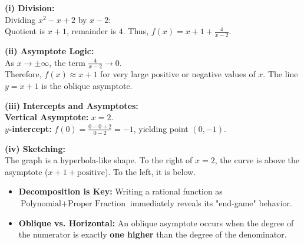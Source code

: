 \begin{solution}
\textbf{(i) Division:} \\
Dividing $x^2 - x + 2$ by $x - 2$: \\
Quotient is $x+1$, remainder is $4$. Thus, $f(x) = x + 1 + \frac{4}{x-2}$.

\textbf{(ii) Asymptote Logic:} \\
As $x \to \pm\infty$, the term $\frac{4}{x-2} \to 0$. \\
Therefore, $f(x) \approx x + 1$ for very large positive or negative values of $x$. The line $y = x + 1$ is the oblique asymptote.

\textbf{(iii) Intercepts and Asymptotes:} \\
\textbf{Vertical Asymptote:} $x = 2$. \\
\textbf{$y$-intercept:} $f(0) = \frac{0-0+2}{0-2} = -1$, yielding point $(0, -1)$.

\textbf{(iv) Sketching:} \\
The graph is a hyperbola-like shape. To the right of $x=2$, the curve is above the asymptote ($x+1 + \text{positive}$). To the left, it is below.

\begin{center}
\end{center}
\end{solution}

\begin{takeaways}
\begin{itemize}[leftmargin=*]
\item \textbf{Decomposition is Key:} Writing a rational function as $\text{Polynomial} + \text{Proper Fraction}$ immediately reveals its "end-game" behavior.
\item \textbf{Oblique vs. Horizontal:} An oblique asymptote occurs when the degree of the numerator is exactly \textbf{one higher} than the degree of the denominator. 
\end{itemize}
\end{takeaways}

